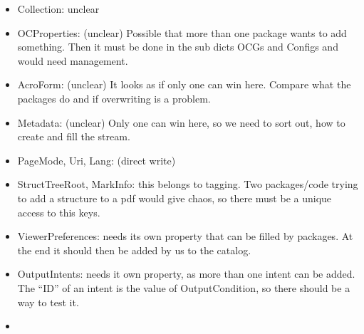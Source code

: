 \documentclass{article}
\begin{document}
\begin{itemize}
 \item Collection: unclear
 \item OCProperties: (unclear) Possible that more than one package wants to add something. Then it must be done in the sub dicts OCGs and Configs and would need management.
 \item AcroForm: (unclear) It looks as if only one can win here. Compare what the packages do and if overwriting is a problem. 
 \item Metadata: (unclear) Only one can win here, so we need to sort out, how to create and fill the stream. 
 \item PageMode, Uri, Lang: (direct write) 
 \item StructTreeRoot, MarkInfo: this belongs to tagging. Two packages/code trying to add a structure to a pdf would give chaos, so there must be a unique access to this keys. 
 \item ViewerPreferences: needs its own property that can be filled by packages. At the end it should then be added by us to the catalog. 
     
 \item OutputIntents: needs it own property, as more than one intent can be added. The \enquote{ID} of an intent is the value of OutputCondition, so there should be a way to test it.
\item       
\end{itemize}
\end{document}
